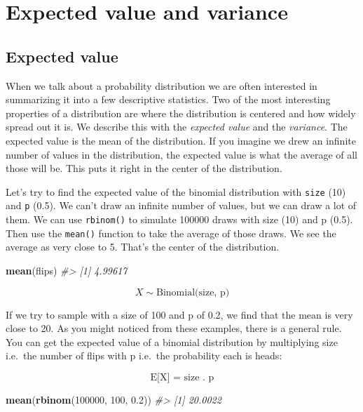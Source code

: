 \documentclass[]{article}
\newenvironment{Shaded}{\begin{snugshade}}{\end{snugshade}}
\newcommand{\CommentTok}[1]{\textcolor[rgb]{0.56,0.35,0.01}{\textit{#1}}}
\newcommand{\DecValTok}[1]{\textcolor[rgb]{0.00,0.00,0.81}{#1}}
\newcommand{\FloatTok}[1]{\textcolor[rgb]{0.00,0.00,0.81}{#1}}
\newcommand{\KeywordTok}[1]{\textcolor[rgb]{0.13,0.29,0.53}{\textbf{#1}}}
\newcommand{\NormalTok}[1]{#1}
\begin{document}
\hypertarget{expected-value-and-variance}{%
\section{Expected value and
variance}\label{expected-value-and-variance}}

\hypertarget{expected-value}{%
\subsection{Expected value}\label{expected-value}}

When we talk about a probability distribution we are often interested in
summarizing it into a few descriptive statistics. Two of the most
interesting properties of a distribution are where the distribution is
centered and how widely spread out it is. We describe this with the
\emph{expected value} and the \emph{variance}. The expected value is the
mean of the distribution. If you imagine we drew an infinite number of
values in the distribution, the expected value is what the average of
all those will be. This puts it right in the center of the distribution.

Let's try to find the expected value of the binomial distribution with
\texttt{size} (10) and \texttt{p} (0.5). We can't draw an infinite
number of values, but we can draw a lot of them. We can use
\texttt{rbinom()} to simulate 100000 draws with size (10) and p (0.5).
Then use the \texttt{mean()} function to take the average of those
draws. We see the average as very close to 5. That's the center of the
distribution.

\begin{Shaded}
\begin{Highlighting}[]
\KeywordTok{mean}\NormalTok{(flips)}
\CommentTok{#> [1] 4.99617}
\end{Highlighting}
\end{Shaded}

\[X  \sim \textrm{Binomial(size, p)} \]

If we try to sample with a size of 100 and p of 0.2, we find that the
mean is very close to 20. As you might noticed from these examples,
there is a general rule. You can get the expected value of a binomial
distribution by multiplying size i.e.~the number of flips with p
i.e.~the probability each is heads:

\[\textrm{E[X] = size . p} \]

\begin{Shaded}
\begin{Highlighting}[]
\KeywordTok{mean}\NormalTok{(}\KeywordTok{rbinom}\NormalTok{(}\DecValTok{100000}\NormalTok{, }\DecValTok{100}\NormalTok{, }\FloatTok{0.2}\NormalTok{))}
\CommentTok{#> [1] 20.0022}
\end{Highlighting}
\end{Shaded}
\end{document}
